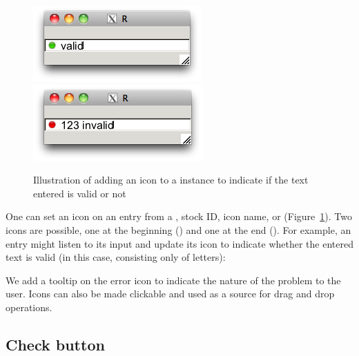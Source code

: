 \begin{figure}
  \centering
  \includegraphics[width=.35\textwidth]{fig-RGtk2-valid-entry.png}\quad
    \includegraphics[width=.35\textwidth]{fig-RGtk2-invalid-entry.png}
  \caption{Illustration of adding an icon to a  instance to indicate if the text entered is valid or not}
  \label{fig:RGtk2-valid-gtkentry}
\end{figure}


One can set an icon on an entry from a , stock ID,
icon name, or 
(Figure~\ref{fig:RGtk2-valid-gtkentry}). Two icons are possible, one
at the beginning () and one at the end
(). For example, an entry might listen to its input
and update its icon to indicate whether the entered text is valid (in
this case, consisting only of letters):
\begin{Schunk}
\end{Schunk}
%
We add a tooltip on the error icon to indicate the nature of the
problem to the user. Icons can also be made clickable and used as a
source for drag and drop operations.

\subsection{Check button}
\label{sec:RGtk2:gtkCheckbox}

